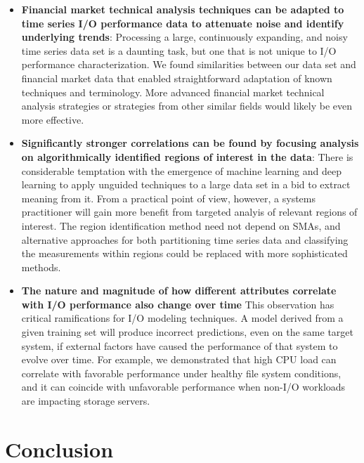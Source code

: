 \begin{itemize}

\item \textbf{Financial market technical analysis techniques can be adapted
to time series I/O performance data to attenuate noise and identify
underlying trends}: Processing a large, continuously expanding, and noisy
time series data set is a daunting task, but one that is not unique to I/O
performance characterization.  We found similarities
between our data set and financial market data that enabled straightforward
adaptation of known techniques and terminology.  More advanced financial
market technical analysis strategies or strategies from other similar fields would likely be even more effective.

\item \textbf{Significantly stronger correlations can be found by focusing
analysis on algorithmically identified regions of interest in the data}:
There is considerable temptation with the emergence of machine learning and
deep learning to apply unguided techniques to a large data set in a bid to
extract meaning from it. From a practical point of view, however, a systems
practitioner will gain more benefit from targeted analyis of relevant regions of
interest.  The region identification method need not depend on SMAs, and alternative
approaches for both partitioning time series data and classifying the
measurements within regions could be replaced with more sophisticated methods.

\item \textbf{The nature and magnitude of how different attributes correlate
with I/O performance also change over time}  This observation has critical
ramifications for I/O modeling techniques.  A model derived from a given training set
will produce incorrect predictions, even on the same target system, if
external factors have caused the performance of that system to evolve over
time. For example, we demonstrated that high CPU load can correlate with favorable performance under healthy file system conditions, and it can coincide with unfavorable performance when non-I/O workloads are impacting storage servers.

\end{itemize}

\section{Conclusion} \label{sec:conclusions}

